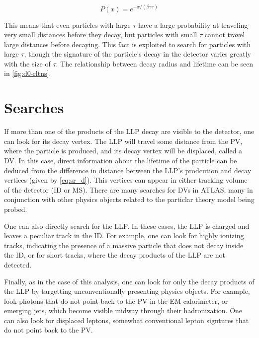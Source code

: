 \begin{equation}
P(x) = e ^{-x/(\beta \gamma \tau)}
\end{equation}

This means that even particles with large $\tau$ have a large probability at traveling very small distances before they decay, but particles with small $\tau$ cannot travel large distances before decaying. This fact is exploited to search for particles with large $\tau$, though the signature of the particle's decay in the detector varies greatly with the size of $\tau$. The relationship between decay radius and lifetime can be seen in \autoref{fig:d0-rltns}. \cite{llp-banerjee}


\section{\label{sec:llp-searches}Searches}



If more than one of the products of the \ac{LLP} decay are visible to the detector, one can look for its decay vertex. The \ac{LLP} will travel some distance from the \ac{PV}, where the particle is produced, and its decay vertex will be displaced, called a \ac{DV}. In this case, direct information about the lifetime of the particle can be deduced from the difference in distance between the \ac{LLP}'s prodcution and decay vertices (given by \autoref{eq:sr_d}). This vertices can appear in either tracking volume of the detector (\ac{ID} or \ac{MS}). There are many searches for \ac{DV}s in \ac{ATLAS}, many in conjunction with other physics objects related to the particlar theory model being probed. 

One can also directly search for the \ac{LLP}. In these cases, the \ac{LLP} is charged and leaves a peculiar track in the \ac{ID}. For example, one can look for highly ionizing tracks, indicating the presence of a massive particle that does not decay inside the \ac{ID}, or for short tracks, where the decay products of the \ac{LLP} are not detected.

Finally, as in the case of this analysis, one can look for only the decay products of the \ac{LLP} by targetting  unconventionally presenting physics objects. For example, look photons that do not point back to the \ac{PV} in the \ac{EM} calorimeter, or emerging jets, which become visible midway through their hadronization. One can also look for displaced leptons, somewhat conventional lepton signtures that do not point back to the \ac{PV}. 

